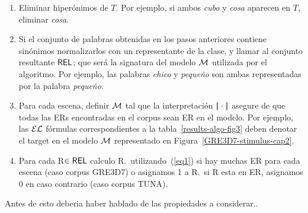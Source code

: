 \begin{enumerate}
\item Eliminar hiper\'onimos de $T$. Por ejemplo, si ambos \emph{cubo} y
  \emph{cosa} aparecen en $T$, eliminar \emph{cosa}.

\item Si el conjunto de palabras obtenidas en los pasos anteriores contiene
  sin\'onimos normalizarlos con un representante de la clase,
  y llamar al conjunto resultante $\textsf{REL}$; que ser\'a la signatura del
  modelo $\mathcal{M}$ utilizada por el algoritmo. Por ejemplo, las palabras \emph{chico}
  y \emph{peque\~no} son ambas representadas por la palabra \emph{peque\~no}.

\item Para cada escena, definir $\mathcal{M}$ tal que la interpretaci\'on
 $|\!|\cdot|\!|$ asegure de que todas las ERs encontradas en el corpus sean ER en
  el modelo. Por ejemplo, las $\mathcal{EL}$ f\'ormulas correspondientes a la tabla~\ref{results-algo-fig3} deben denotar el target en el
  modelo $\mathcal{M}$ representado en
  Figura~\ref{GRE3D7-stimulus-cap2}.
\item Para cada R$\in \textsf{REL}$ calculo R.\puse \ utilizando~(\ref{eq1}) si
  hay muchas ER para cada escena (caso corpus GRE3D7) o asignamos 1 a R.\puse \ si R esta en ER, asignamos 0 en caso contrario (caso corpus TUNA).


\end{enumerate}




Antes de esto deberia haber hablado de las propiedades a considerar..





